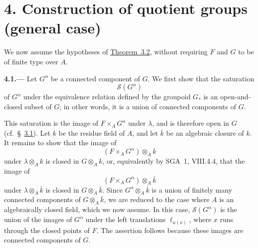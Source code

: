 
\section*{4. Construction of quotient groups (general case)}
\label{sec:sga3-VIA-4}

We now assume the hypotheses of \hyperref[thm:sga3-VIA-3.2]{Theorem~3.2}, without requiring
\(F\) and \(G\) to be of finite type over \(A\).

\medskip
{}\label{par:sga3-VIA-4.1}%
\noindent\textbf{4.1.---}
Let \(G^\alpha\) be a connected component of \(G\). We first show
that the saturation
\[
  \mathscr S(G^\alpha)
\]%
of \(G^\alpha\) under the equivalence relation defined by the
groupoid \(G_*\) is an open-and-closed subset of \(G\); in other
words, it is a union of connected components of \(G\).

This saturation is the image of \(F\times_A G^\alpha\) under
\(\lambda\), and is therefore open in \(G\) (cf.\ \S~\hyperref[par:sga3-VIA-3.1]{3.1}). Let
\(k\) be the residue field of \(A\), and let \(\bar k\) be an
algebraic closure of \(k\). It remains to show that the image of
\[
  (F\times_A G^\alpha)\otimes_A k
\]
under \(\lambda\otimes_A k\) is closed in \(G\otimes_A k\), or,
equivalently by SGA~1, VIII.4.4, that the image of
\[
  (F\times_A G^\alpha)\otimes_A\bar k
\]
under \(\lambda\otimes_A\bar k\) is closed in
\(G\otimes_A\bar k\). Since \(G^\alpha\otimes_A\bar k\) is a union
of finitely many connected components of \(G\otimes_A\bar k\), we
are reduced to the case where \(A\) is an algebraically closed field,
which we now assume. In this case, \(\mathscr S(G^\alpha)\) is the
union of the images of \(G^\alpha\) under the left translations
\(\ell_{u(x)}\), where \(x\) runs through the closed points of \(F\).
The assertion follows because these images are connected components
of \(G\).
